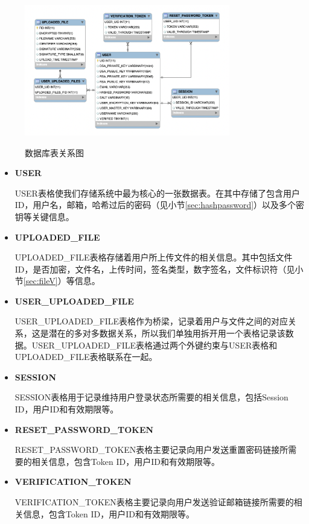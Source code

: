 \begin{figure}[!htb]
	\centering
	\includegraphics[width=0.8\textwidth]
	{figures/db.png}\\
	\caption{数据库表关系图}
	\label{fig:db}
\end{figure}

\begin{itemize}
	\item \textbf{USER}
	
	USER表格使我们存储系统中最为核心的一张数据表。在其中存储了包含用户ID，用户名，邮箱，哈希过后的密码（见小节\ref{sec:hashpassword}）以及多个密钥等关键信息。
	
	\item \textbf{UPLOADED\_FILE}
	
	UPLOADED\_FILE表格存储着用户所上传文件的相关信息。其中包括文件ID，是否加密，文件名，上传时间，签名类型，数字签名，文件标识符（见小节\ref{sec:fileV}）等信息。
	
	\item \textbf{USER\_UPLOADED\_FILE}
	
	USER\_UPLOADED\_FILE表格作为桥梁，记录着用户与文件之间的对应关系，这是潜在的多对多数据关系，所以我们单独用拆开用一个表格记录该数据。USER\_UPLOADED\_FILE表格通过两个外键约束与USER表格和UPLOADED\_FILE表格联系在一起。
	
	\item \textbf{SESSION}
	
	SESSION表格用于记录维持用户登录状态所需要的相关信息，包括Session ID，用户ID和有效期限等。
	
	\item \textbf{RESET\_PASSWORD\_TOKEN}
	
	RESET\_PASSWORD\_TOKEN表格主要记录向用户发送重置密码链接所需要的相关信息，包含Token ID，用户ID和有效期限等。
	
	\item \textbf{VERIFICATION\_TOKEN}
	
	VERIFICATION\_TOKEN表格主要记录向用户发送验证邮箱链接所需要的相关信息，包含Token ID，用户ID和有效期限等。
	
\end{itemize}

